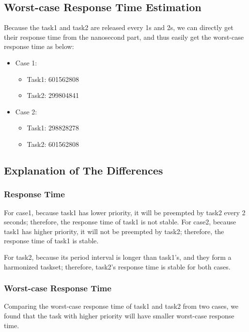 \documentclass[letterpaper, 12pt]{article}
\begin{document}
\subsection{Worst-case Response Time Estimation}

Because the task1 and task2 are released every 1s and 2s, we can directly get their response time from the nanosecond part, and thus easily get the worst-case response time as below:

\begin{itemize}
	\item Case 1:
	\begin{itemize}
		\item Task1: 601562808
		\item Task2: 299804841
	\end{itemize}
	\item Case 2:
	\begin{itemize}
		\item Task1: 298828278
		\item Task2: 601562808
	\end{itemize}
\end{itemize}

\subsection{Explanation of The Differences}

\subsubsection{Response Time}

For case1, because task1 has lower priority, it will be preempted by task2 every 2 seconds; therefore, the response time of task1 is not stable. For case2, because task1 has higher priority, it will not be preempted by task2; therefore, the response time of task1 is stable.

For task2, because its period interval is longer than task1's, and they form a harmonized taskset; therefore, task2's response time is stable for both cases.

\subsubsection{Worst-case Response Time}

Comparing the worst-case response time of task1 and task2 from two cases, we found that the task with higher priority will have smaller worst-case response time.
\end{document}

